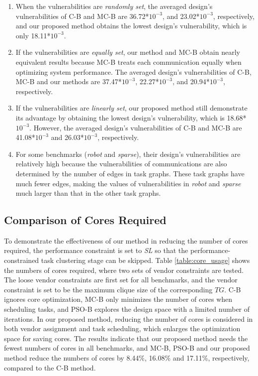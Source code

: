 \documentclass[10pt,journal, compsoc]{IEEEtran}
\begin{document}
\begin{enumerate}
    \item When the vulnerabilities are \textit{randomly set}, the averaged design's vulnerabilities of C-B and MC-B are 36.72*$10^{-3}$, and 23.02*$10^{-3}$, respectively, and our proposed method obtains the lowest design's vulnerability, which is only 18.11*$10^{-3}$.
    \item If the vulnerabilities are \textit{equally set}, our method and MC-B obtain nearly equivalent results because MC-B treats each communication equally when optimizing system performance. The averaged design's vulnerabilities of C-B, MC-B and our methods are 37.47*$10^{-3}$, 22.27*$10^{-3}$, and 20.94*$10^{-3}$, respectively.
    \item If the vulnerabilities are \textit{linearly set}, our proposed method still demonstrate its advantage by obtaining the lowest design's vulnerability, which is 18.68*$10^{-3}$. However, the averaged design's vulnerabilities of C-B and MC-B are 41.08*$10^{-3}$ and 26.03*$10^{-3}$, respectively.
    \item For some benchmarks (\textit{robot} and \textit{sparse}), their design's vulnerabilities are relatively high because the vulnerabilities of communications are also determined by the number of edges in task graphs. These task graphs have much fewer edges, making the values of vulnerabilities in \textit{robot} and \textit{sparse} much larger than that in the other task graphs.
\end{enumerate}





\subsection{Comparison of Cores Required}

To demonstrate the effectiveness of our method in reducing the number of cores required, the performance constraint is set to \textit{SL} so that the performance-constrained task clustering stage can be skipped. Table \ref{table:core_usage} shows the numbers of cores required, where two sets of vendor constraints are tested. The loose vendor constraints are first set for all benchmarks, and the vendor constraint is set to be the maximum clique size of the corresponding $TG$. C-B ignores core optimization, MC-B only minimizes the number of cores when scheduling tasks, and PSO-B explores the design space with a limited number of iterations. In our proposed method, reducing the number of cores is considered in both vendor assignment and task scheduling, which enlarges the optimization space for saving cores. The results indicate that our proposed method needs the fewest numbers of cores in all benchmarks, and MC-B, PSO-B and our proposed method reduce the numbers of cores by 8.44\%, 16.08\% and 17.11\%, respectively, compared to the C-B method.
\end{document}

